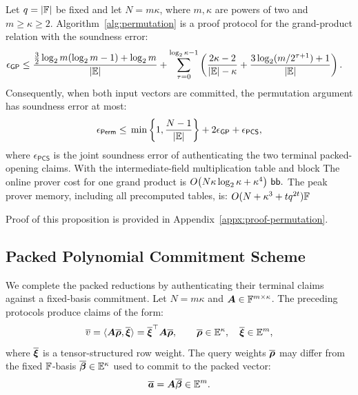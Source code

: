 \begin{proposition}
\label{proposition:permutation-complexity}
Let \(q=|{\mathbb{F}}|\) be fixed and let
\(N=m\kappa\), where \(m,\kappa\) are powers of two and
\(m\geq\kappa\geq2\).
Algorithm~\ref{alg:permutation} is a proof protocol for the grand-product relation
with the soundness error:
\[
\begin{aligned}
    \epsilon_{\mathsf{GP}}\leq{}&
    \frac{\frac32\log_2m(\log_2m-1)+\log_2m}
         {|\mathbb{E}|}+\sum_{\tau=0}^{\log_2\kappa-1}
      \left(
        \frac{2\kappa-2}{|\mathbb{E}|-\kappa}
        +\frac{3\log_2(m/2^{\tau+1})+1}{|\mathbb{E}|}
      \right).
\end{aligned}
\]
Consequently, when both input vectors are committed, the
permutation argument has soundness error at most:
\[
    \epsilon_{\mathsf{Perm}}\leq{} \min\left\{1,\frac{N-1}{|\mathbb{E}|}\right\}
       +2\epsilon_{\mathsf{GP}}+\epsilon_{\mathsf{PCS}},
\]
where \(\epsilon_{\mathsf{PCS}}\) is the joint soundness error
of authenticating the two terminal packed-opening claims.
With the intermediate-field multiplication table and block
The online prover cost for one
grand product is
\(
    O\!\left(N\kappa\log_2\kappa+\kappa^4\right)\,\mathsf{bb}.
\)
The peak prover memory, including all precomputed tables, is:
\(
    O(N+\kappa^3+tq^{2t}){\mathbb{F}}
\)
\end{proposition}

Proof of this proposition is provided in Appendix~\ref{appx:proof-permutation}.

\subsection{Packed Polynomial Commitment Scheme}
\label{sec:pcs}

We complete the packed reductions by authenticating their
terminal claims against a fixed-basis commitment.
Let \(N=m\kappa\) and \(\bm A\in{\mathbb{F}}^{m\times\kappa}\).
The preceding protocols produce claims of the form:
\[
    \overline{v}
    =\langle\bm A\overline{\bm\rho},\overline{\bm\xi}\rangle
    =\overline{\bm\xi}^{\top}\bm A\overline{\bm\rho},
    \qquad
    \overline{\bm\rho}\in\mathbb{E}^\kappa,
    \quad
    \overline{\bm\xi}\in\mathbb{E}^m,
\]
where \(\overline{\bm\xi}\) is a tensor-structured row weight.
The query weights \(\overline{\bm\rho}\) may differ from the fixed
\({\mathbb{F}}\)-basis \(\overline{\bm\beta}\in\mathbb{E}^\kappa\)
used to commit to the packed vector:
\[
    \overline{\bm a}=\bm A\overline{\bm\beta}\in\mathbb{E}^m.
\]

